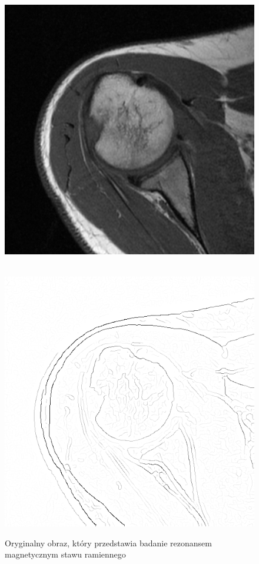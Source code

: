 \documentclass[a4paper,11pt,twoside,openright]{report}
\theoremstyle{definition}
\begin{document}
\begin{figure}[p!]
	\center
		\includegraphics[width=\linewidth]{123}
		\caption{Oryginalny obraz, który przedstawia badanie rezonansem magnetycznym
		stawu ramiennego}%
		\label{fig:123}
	\endminipage
	\\
		\includegraphics[width=\linewidth]{126}

\end{figure}
\end{document}

